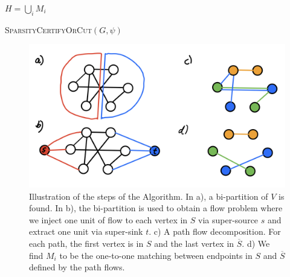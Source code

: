 \begin{algorithm}[H]
    \Return $H = \bigcup_{i} M_i$
  \caption{\textsc{SparsityCertifyOrCut}$(G, \psi)$}
  \label{algo:cutMatchingGame}
\end{algorithm}

\begin{figure}[!ht]
    \centering
    \includegraphics[scale=0.2]{./fig/AlgorithmProcessing_lectureCutMatching.jpeg}
    \caption{Illustration of the steps of the Algorithm. In a), a bi-partition of $V$ is found. In b), the bi-partition is used to obtain a flow problem where we inject one unit of flow to each vertex in $S$ via super-source $s$ and extract one unit via super-sink $t$. c) A path flow decomposition. For each path, the first vertex is in $S$ and the last vertex in $\overline{S}$. d) We find $M_i$ to be the one-to-one matching between endpoints in $S$ and $\overline{S}$ defined by the path flows.}
    \label{fig:my_label}
\end{figure}

